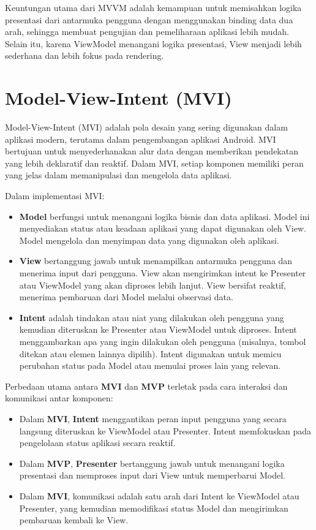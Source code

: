 Keuntungan utama dari MVVM adalah kemampuan untuk memisahkan logika presentasi dari antarmuka pengguna dengan menggunakan binding data dua arah, sehingga membuat pengujian dan pemeliharaan aplikasi lebih mudah. Selain itu, karena ViewModel menangani logika presentasi, View menjadi lebih sederhana dan lebih fokus pada rendering.


\section{Model-View-Intent (MVI)}

Model-View-Intent (MVI) adalah pola desain yang sering digunakan dalam aplikasi modern, terutama dalam pengembangan aplikasi Android. MVI bertujuan untuk menyederhanakan alur data dengan memberikan pendekatan yang lebih deklaratif dan reaktif. Dalam MVI, setiap komponen memiliki peran yang jelas dalam memanipulasi dan mengelola data aplikasi.

Dalam implementasi MVI:

\begin{itemize}
	\item \textbf{Model} berfungsi untuk menangani logika bisnis dan data aplikasi. Model ini menyediakan status atau keadaan aplikasi yang dapat digunakan oleh View. Model mengelola dan menyimpan data yang digunakan oleh aplikasi.
	\item \textbf{View} bertanggung jawab untuk menampilkan antarmuka pengguna dan menerima input dari pengguna. View akan mengirimkan intent ke Presenter atau ViewModel yang akan diproses lebih lanjut. View bersifat reaktif, menerima pembaruan dari Model melalui observasi data.
	\item \textbf{Intent} adalah tindakan atau niat yang dilakukan oleh pengguna yang kemudian diteruskan ke Presenter atau ViewModel untuk diproses. Intent menggambarkan apa yang ingin dilakukan oleh pengguna (misalnya, tombol ditekan atau elemen lainnya dipilih). Intent digunakan untuk memicu perubahan status pada Model atau memulai proses lain yang relevan.
\end{itemize}

Perbedaan utama antara \textbf{MVI} dan \textbf{MVP} terletak pada cara interaksi dan komunikasi antar komponen:
\begin{itemize}
	\item Dalam \textbf{MVI}, \textbf{Intent} menggantikan peran input pengguna yang secara langsung diteruskan ke ViewModel atau Presenter. Intent memfokuskan pada pengelolaan status aplikasi secara reaktif.
	\item Dalam \textbf{MVP}, \textbf{Presenter} bertanggung jawab untuk menangani logika presentasi dan memproses input dari View untuk memperbarui Model.
	\item Dalam \textbf{MVI}, komunikasi adalah satu arah dari Intent ke ViewModel atau Presenter, yang kemudian memodifikasi status Model dan mengirimkan pembaruan kembali ke View.
\end{itemize}

